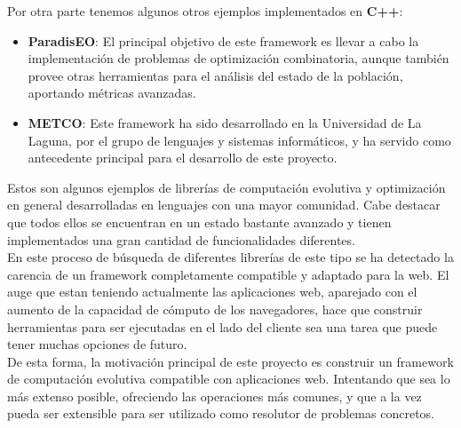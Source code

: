 Por otra parte tenemos algunos otros ejemplos implementados en \textbf{C++}:

\begin{itemize}
    \item \textbf{ParadisEO}: El principal objetivo de este framework es llevar a cabo la implementación de problemas de optimización combinatoria, aunque también provee otras herramientas para el análisis del estado de la población, aportando métricas avanzadas.
    \item \textbf{METCO}: Este framework ha sido desarrollado en la Universidad de La Laguna, por el grupo de lenguajes y sistemas informáticos, y ha servido como antecedente principal para el desarrollo de este proyecto.
\end{itemize}

Estos son algunos ejemplos de librerías de computación evolutiva y optimización en general desarrolladas en lenguajes con una mayor comunidad. Cabe destacar que todos ellos se encuentran en un estado bastante avanzado y tienen implementados una gran cantidad de funcionalidades diferentes. \\

En este proceso de búsqueda de diferentes librerías de este tipo se ha detectado la carencia de un framework completamente compatible y adaptado para la web. El auge que estan teniendo actualmente las aplicaciones web, aparejado con el aumento de la capacidad de cómputo de los navegadores, hace que construir herramientas para ser ejecutadas en el lado del cliente sea una tarea que puede tener muchas opciones de futuro. \\

De esta forma, la motivación principal de este proyecto es construir un framework de computación evolutiva compatible con aplicaciones web. Intentando que sea lo más extenso posible, ofreciendo las operaciones más comunes, y que a la vez pueda ser extensible para ser utilizado como resolutor de problemas concretos.